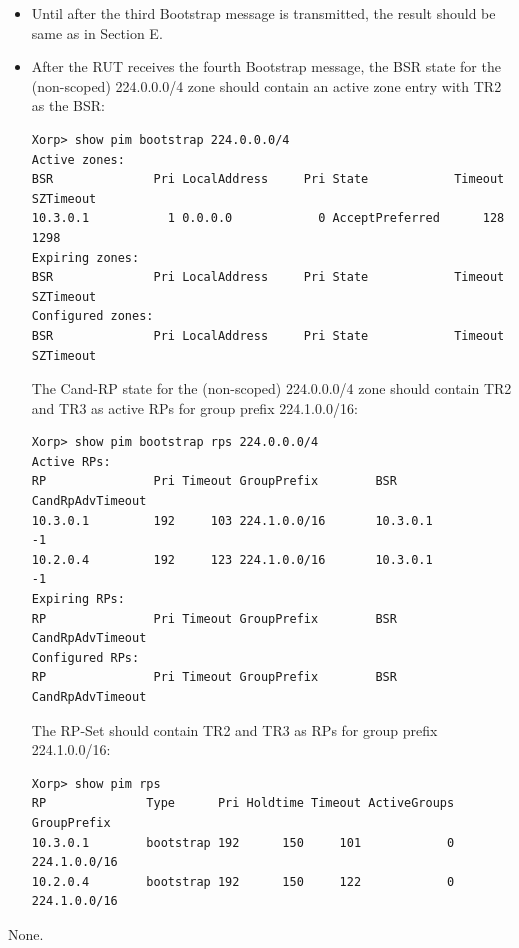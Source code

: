 \documentclass[11pt]{report}
\begin{document}
\begin{itemize}

  \item Until after the third Bootstrap message is transmitted, the result
  should be same as in Section E.

  \item After the RUT receives the fourth Bootstrap message, the BSR state for
  the (non-scoped) 224.0.0.0/4 zone should contain an active zone entry with
  TR2 as the BSR:

\begin{verbatim}
Xorp> show pim bootstrap 224.0.0.0/4
Active zones:
BSR              Pri LocalAddress     Pri State            Timeout SZTimeout
10.3.0.1           1 0.0.0.0            0 AcceptPreferred      128      1298
Expiring zones:
BSR              Pri LocalAddress     Pri State            Timeout SZTimeout
Configured zones:
BSR              Pri LocalAddress     Pri State            Timeout SZTimeout
\end{verbatim}

  The Cand-RP state for the (non-scoped) 224.0.0.0/4 zone should
  contain TR2 and TR3 as active RPs for group prefix 224.1.0.0/16:

\begin{verbatim}
Xorp> show pim bootstrap rps 224.0.0.0/4
Active RPs:
RP               Pri Timeout GroupPrefix        BSR         CandRpAdvTimeout
10.3.0.1         192     103 224.1.0.0/16       10.3.0.1                  -1
10.2.0.4         192     123 224.1.0.0/16       10.3.0.1                  -1
Expiring RPs:
RP               Pri Timeout GroupPrefix        BSR         CandRpAdvTimeout
Configured RPs:
RP               Pri Timeout GroupPrefix        BSR         CandRpAdvTimeout
\end{verbatim}

  The RP-Set should contain TR2 and TR3 as RPs for group prefix 224.1.0.0/16:

\begin{verbatim}
Xorp> show pim rps 
RP              Type      Pri Holdtime Timeout ActiveGroups GroupPrefix       
10.3.0.1        bootstrap 192      150     101            0 224.1.0.0/16      
10.2.0.4        bootstrap 192      150     122            0 224.1.0.0/16      
\end{verbatim}

\end{itemize}

None.


\end{document}
